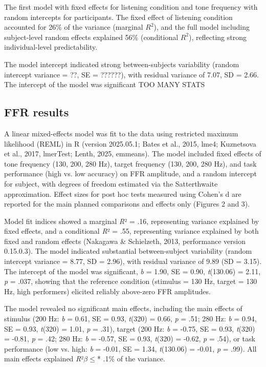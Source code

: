 The first model with fixed effects for listening condition and tone frequency with random intercepts for participants. The fixed effect of listening condition accounted for 26\% of the variance (marginal $R^2$), and the full model including subject-level random effects explained 56\% (conditional $R^2$), reflecting strong individual-level predictability. 



The model intercept indicated strong between-subjects variability (random intercept variance = ??, SE = ??????), with residual variance of 7.07, SD = 2.66. The intercept of the model was significant TOO MANY STATS








\subsection*{FFR results}
A linear mixed-effects model was fit to the data using restricted maximum likelihood (REML) in R (version 2025.05.1; Bates et al., 2015, lme4; Kuznetsova et al., 2017, lmerTest; Lenth, 2025, emmeans). The model included fixed effects of tone frequency (130, 200, 280 Hz), target frequency (130, 200, 280 Hz), and task performance (high vs. low accuracy) on FFR amplitude, and a random intercept for subject, with degrees of freedom estimated via the Satterthwaite approximation. Effect sizes for post hoc tests measured using Cohen’s d are reported for the main planned comparisons and effects only (Figures 2 and 3). 

Model fit indices showed a marginal \textit{R}² = .16, representing variance explained by fixed effects, and a conditional \textit{R}² = .55, representing variance explained by both fixed and random effects (Nakagawa \& Schielzeth, 2013, performance version 0.15.0.3). The model indicated substantial between-subject variability (random intercept variance = 8.77, SD = 2.96), with residual variance of 9.89 (SD = 3.15). The intercept of the model was significant, \textit{b} = 1.90, SE = 0.90, \textit{t}(130.06) = 2.11, \textit{p} = .037, showing that the reference condition (stimulus = 130 Hz, target = 130 Hz, high performers) elicited reliably above-zero FFR amplitudes.

The model revealed no significant main effects, including the main effects of stimulus (200 Hz: \textit{b} = 0.61, SE = 0.93, \textit{t}(320) = 0.66, \textit{p} = .51; 280 Hz: \textit{b} = 0.94, SE = 0.93, \textit{t}(320) = 1.01, \textit{p} = .31), target (200 Hz: \textit{b} = -0.75, SE = 0.93, \textit{t}(320) = -0.81, \textit{p} = .42; 280 Hz: \textit{b} = -0.57, SE = 0.93, \textit{t}(320) = -0.62, \textit{p} = .54), or task performance (low vs. high: \textit{b} = -0.01, SE = 1.34, \textit{t}(130.06) = -0.01, \textit{p} = .99). All main effects explained \textit{R}²$\beta \leq$* .1\% of the variance.

